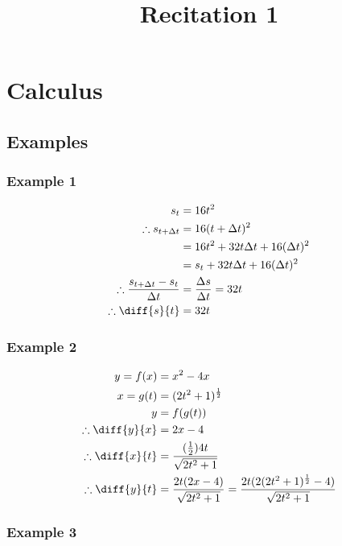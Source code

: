 \documentclass[fleqn]{article}
\title{Recitation 1}
\author{}
\date{\formatdate{29}{10}{2014}}
\begin{document}
\maketitle

\tableofcontents

\newpage
\section{Calculus}

\subsection{Examples}

\subsubsection{Example 1}

\begin{align*}
	s_t &= 16 t^2 \\
	\therefore s_{t + \Delta t} &= 16 (t + \Delta t)^2 \\
	&= 16t^2 + 32t \Delta t + 16 (\Delta t)^2 \\
	&= s_t + 32t \Delta t + 16 (\Delta t)^2 \\
	\therefore \dfrac{s_{t + \Delta t} - s_t}{\Delta t} &= \dfrac{\Delta s}{\Delta t} = 32 t \\
	\therefore \diff{s}{t} &= 32 t
\end{align*}

\subsubsection{Example 2}

\begin{align*}
	y = f(x) &= x^2 - 4x\\
	x = g(t) &= (2t^2 + 1)^{\frac{1}{2}}\\
	y &= f(g(t))\\
	\therefore \diff{y}{x} &= 2x -4\\
	\therefore \diff{x}{t} &= \dfrac{(\frac{1}{2})4 t}{\sqrt{2t^2 + 1}}\\
	\therefore \diff{y}{t} &= \dfrac{2t(2x-4)}{\sqrt{2t^2 + 1}} = \dfrac{2t(2(2t^2 + 1)^{\frac{1}{2}}-4)}{\sqrt{2t^2 + 1}} \\
\end{align*}

\subsubsection{Example 3}
\end{document}
